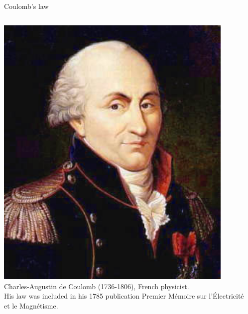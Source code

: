 \begin{frame}{Coulomb's law}

\begin{columns}[t]
  \begin{column}{0.20\textwidth}
   \begin{center}
     \vspace{0.2cm}
     \includegraphics[width=0.90\textwidth]{./images/people/coulomb.jpg}\\
     {\scriptsize
      Charles-Augustin de Coulomb (1736-1806), French physicist.\\
      \vspace{0.2cm}
      His law was included in his 1785 publication
      Premier M\'emoire sur l'\'Electricit\'e et le Magn\'etisme.\\
     }
   \end{center}
  \end{column}
  \begin{column}{0.55\textwidth}
    \begin{center}

\end{center}
\end{column}
\end{columns}
\end{frame}
